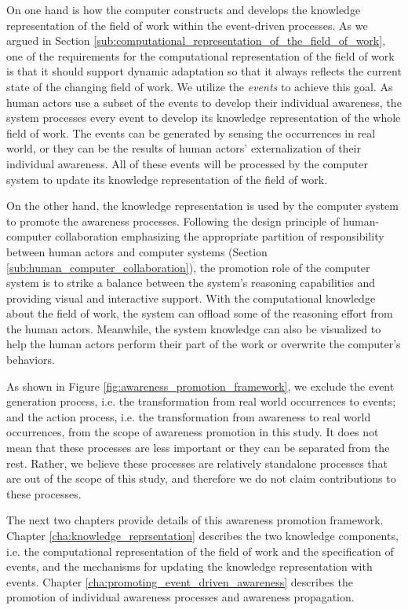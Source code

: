 On one hand is how the computer constructs and develops the knowledge representation of the field of work within the event-driven processes. As we argued in Section \ref{sub:computational_representation_of_the_field_of_work}, one of the requirements for the computational representation of the field of work is that it should support dynamic adaptation so that it always reflects the current state of the changing field of work. We utilize the \emph{events} to achieve this goal. As human actors use a subset of the events to develop their individual awareness, the system processes every event to develop its knowledge representation of the whole field of work. The events can be generated by sensing the occurrences in real world, or they can be the results of human actors' externalization of their individual awareness. All of these events will be processed by the computer system to update its knowledge representation of the field of work.

On the other hand, the knowledge representation is used by the computer system to promote the awareness processes. Following the design principle of human-computer collaboration emphasizing the appropriate partition of responsibility between human actors and computer systems (Section \ref{sub:human_computer_collaboration}), the promotion role of the computer system is to strike a balance between the system's reasoning capabilities and providing visual and interactive support. With the computational knowledge about the field of work, the system can offload some of the reasoning effort from the human actors. Meanwhile, the system knowledge can also be visualized to help the human actors perform their part of the work or overwrite the computer's behaviors. 

As shown in Figure \ref{fig:awareness_promotion_framework}, we exclude the event generation process, i.e. the transformation from real world occurrences to events; and the action process, i.e. the transformation from awareness to real world occurrences, from the scope of awareness promotion in this study. It does not mean that these processes are less important or they can be separated from the rest. Rather, we believe these processes are relatively standalone processes that are out of the scope of this study, and therefore we do not claim contributions to these processes. 

The next two chapters provide details of this awareness promotion framework. Chapter \ref{cha:knowledge_reprsentation} describes the two knowledge components, i.e. the computational representation of the field of work and the specification of events, and the mechanisms for updating the knowledge representation with events. Chapter \ref{cha:promoting_event_driven_awareness} describes the promotion of individual awareness processes and awareness propagation.




 

